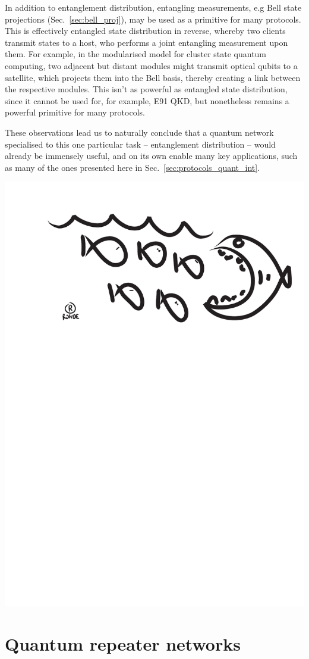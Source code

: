 \documentclass[aps, rmp, twocolumn, amsmath, amssymb, nofootinbib, superscriptaddress, longbibliography, floatfix, table-of-contents, eqsecnum]{revtex4-1}
\newcommand{\comment}[1]{{\color{blue}{\textbf{#1}}}}
\begin{document}
\comment{Any other advantages?}

In addition to entanglement distribution, entangling measurements, e.g Bell state projections (Sec.~\ref{sec:bell_proj}), may be used as a primitive for many protocols. This is effectively entangled state distribution in reverse, whereby two clients transmit states to a host, who performs a joint entangling measurement upon them. For example, in the modularised model for cluster state quantum computing, two adjacent but distant modules might transmit optical qubits to a satellite, which projects them into the Bell basis, thereby creating a link between the respective modules. This isn't as powerful as entangled state distribution, since it cannot be used for, for example, E91 QKD, but nonetheless remains a powerful primitive for many protocols.

These observations lead us to naturally conclude that a quantum network specialised to this one particular task -- entanglement distribution -- would already be immensely useful, and on its own enable many key applications, such as many of the ones presented here in Sec.~\ref{sec:protocols_quant_int}.

\begin{center}
	\includegraphics[width=0.6\columnwidth]{sketch_29}
\end{center}

%
%

\section{Quantum repeater networks} \label{sec:rep_net} 
\end{document}
